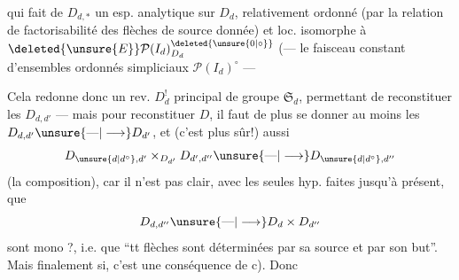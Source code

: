 qui fait de $D_{d,*}$ un esp. analytique sur $D_d$,  relativement ordonné (par la relation de factorisabilité
\diagram{\begin{tikzcd}[ampersand replacement=\&, column sep=small,row sep=small]
{} \& {} \arrow[dd,dotted] \\
\bullet \arrow[ru] \arrow[rd] \& \\
{} \& {}
\end{tikzcd}}
des flèches de source donnée)  et loc. isomorphe à $\deleted{\unsure{E}}\mathcal P(I_d)^{\deleted{\unsure{0|\circ}}}_{D_d}$  (--- le faisceau constant d'ensembles ordonnés simpliciaux $\mathcal P(I_d)^\circ$ ---

Cela redonne donc un rev. $D^!_d$ principal de groupe $\mathfrak S_d$, permettant de reconstituer les $D_{d,d'}$ --- mais pour reconstituer $D$, il faut de plus se donner  au moins les $D_{d,d'}\unsure{\text{---}|\longrightarrow}D_{d'}$, et (c'est plus sûr!) aussi
\[
D_{\unsure{d|d^\circ},d'}\mathbin{\times}_{D_{d'}}D_{d',d''}\unsure{\text{---}|\longrightarrow}D_{\unsure{d|d^\circ},d''}
\]
(la  composition), car il n'est pas clair, avec les seules hyp. faites jusqu'à présent, que  
\[
D_{d,d''}\unsure{\text{---}|\longrightarrow}D_d\times D_{d''}
\]
sont mono ?, i.e. que ``tt flèches sont déterminées par sa source et par son but''. Mais finalement si, c'est une conséquence de c). Donc
